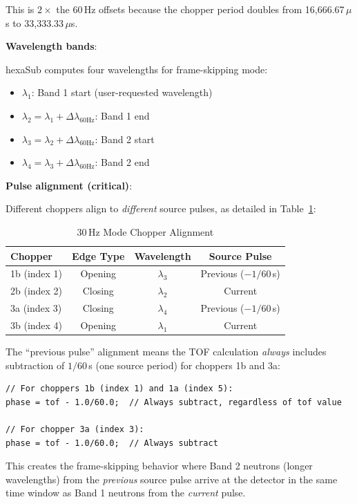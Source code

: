 \documentclass[11pt,letterpaper]{article}
\begin{document}
This is $2 \times$ the 60\,Hz offsets because the chopper period doubles from 16,666.67\,$\mu$s to 33,333.33\,$\mu$s.

\textbf{Wavelength bands}:

hexaSub computes four wavelengths for frame-skipping mode:
\begin{itemize}
    \item $\lambda_1$: Band 1 start (user-requested wavelength)
    \item $\lambda_2 = \lambda_1 + \Delta\lambda_{60\text{Hz}}$: Band 1 end
    \item $\lambda_3 = \lambda_2 + \Delta\lambda_{60\text{Hz}}$: Band 2 start  
    \item $\lambda_4 = \lambda_3 + \Delta\lambda_{60\text{Hz}}$: Band 2 end
\end{itemize}

\textbf{Pulse alignment (critical)}:

Different choppers align to \emph{different} source pulses, as detailed in Table~\ref{tab:30hz_alignment}:

\begin{table}[h]
\centering
\caption{30\,Hz Mode Chopper Alignment}
\label{tab:30hz_alignment}
\begin{tabular}{lccc}
\toprule
Chopper & Edge Type & Wavelength & Source Pulse \\
\midrule
1b (index 1) & Opening & $\lambda_3$ & Previous ($-1/60$\,s) \\
2b (index 2) & Closing & $\lambda_2$ & Current \\
3a (index 3) & Closing & $\lambda_4$ & Previous ($-1/60$\,s) \\
3b (index 4) & Opening & $\lambda_1$ & Current \\
\bottomrule
\end{tabular}
\end{table}

The ``previous pulse'' alignment means the TOF calculation \emph{always} includes subtraction 
of $1/60$\,s (one source period) for choppers 1b and 3a:

\begin{verbatim}
// For choppers 1b (index 1) and 1a (index 5):
phase = tof - 1.0/60.0;  // Always subtract, regardless of tof value

// For chopper 3a (index 3):
phase = tof - 1.0/60.0;  // Always subtract
\end{verbatim}

This creates the frame-skipping behavior where Band 2 neutrons (longer wavelengths) from the 
\emph{previous} source pulse arrive at the detector in the same time window as Band 1 neutrons 
from the \emph{current} pulse.
\end{document}
